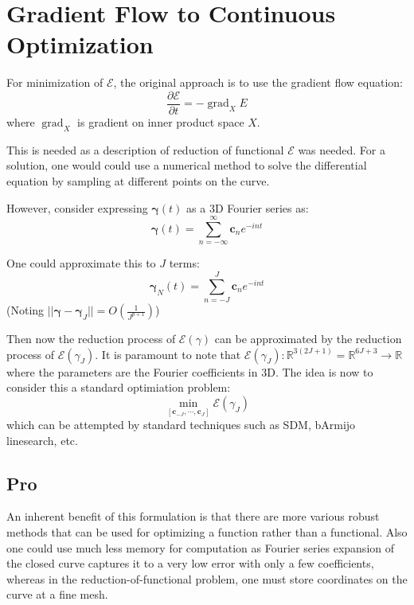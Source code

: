 \documentclass[a4paper]{article}
\newcommand{\norm}[1]{||#1||}
\DeclareMathOperator{\grad}{grad}
\begin{document}
\section{Gradient Flow to Continuous Optimization}
For minimization of $\mathcal{E}$, the original approach is to use the gradient flow equation:
\begin{equation}
    \frac{\partial \mathcal{E}}{\partial t} = - \grad_X {E}
\end{equation}
where $\grad_X$ is gradient on inner product space $X$.

This is needed as a description of reduction of functional $\mathcal{E}$ was needed.
For a solution, one would could use a numerical method to solve the differential equation
by sampling at different points on the curve.

However, consider expressing $\boldsymbol{\gamma}(t)$ as a 3D Fourier series as:
\begin{equation}
    \boldsymbol{\gamma}(t) = \sum_{n=-\infty}^{\infty} \mathbf{c}_n e^{-int}
\end{equation}

One could approximate this to $J$ terms:
\begin{equation}
    \boldsymbol{\gamma}_N (t) = \sum_{n = -J}^{J} \mathbf{c}_n e^{-int}
\end{equation}
(Noting $\norm{\boldsymbol{\gamma} - \boldsymbol{\gamma}_J} = O\left( \frac{1}{J^{p+1}} \right)$)

Then now the reduction process of $\mathcal{E}\left( \gamma \right)$ can be approximated by the reduction process of $\mathcal{E}\left( \gamma_J \right)$.
It is paramount to note that $\mathcal{E} \left( \gamma_J \right): \mathbb{R}^{3\left( 2J + 1 \right)} = \mathbb{R}^{6J + 3} \rightarrow \mathbb{R}$ where the parameters are the Fourier coefficients in 3D.
The idea is now to consider this a standard optimiation problem:
\begin{equation}
    \min_{\left[ \mathbf{c}_{-J}, \cdots, \mathbf{c}_{J} \right]} \mathcal{E} \left( \gamma_J \right)
\end{equation}
which can be attempted by standard techniques such as SDM, bArmijo linesearch, etc.

\subsection{Pro}
An inherent benefit of this formulation is that there are more various robust methods that can be used for optimizing a function rather than a functional.
Also one could use much less memory for computation as Fourier series expansion of the closed curve captures it to a very low error with only a few coefficients, whereas in the reduction-of-functional problem, one must store coordinates on the curve at a fine mesh.
\end{document}
